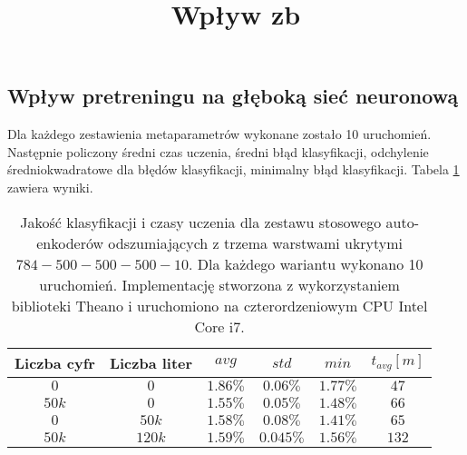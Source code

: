 \documentclass[fleqn]{scrartcl}
\begin{document}
\subsection{Wpływ pretreningu na głęboką sieć neuronową}
Dla każdego zestawienia metaparametrów wykonane zostało 10 uruchomień. Następnie policzony średni czas uczenia, średni błąd klasyfikacji, odchylenie średniokwadratowe dla błędów klasyfikacji, minimalny błąd klasyfikacji. Tabela \ref{table:results} zawiera wyniki.

\begin {table}
\title{Wpływ zb}
\begin{center}
\begin{tabular}{cc|ccc|c}
    \hline
    Liczba cyfr & Liczba liter    & $avg$     & $std$     & $min$      & $t_{avg}[m]$   \\
    \hline
    $0$ &    $0$           & $1.86\%$  & $0.06\%$  & $1.77\%$  &      $47$                    \\
    $50k$ & $0$            & $1.55\%$  & $0.05\%$  & $1.48\%$  &      $66$              \\
    $0$   & $50k$            & $1.58\%$  & $0.08\%$  & $1.41\%$  &      $65$             \\
    $50k$ & $120k$           & $1.59\%$  & $0.045\%$ & $1.56\%$  &    $132$  \\

\end{tabular}
\caption {Jakość klasyfikacji i czasy uczenia dla zestawu stosowego auto-enkoderów odszumiających z trzema warstwami ukrytymi $784 -500-500-500- 10$. Dla każdego wariantu wykonano 10 uruchomień. Implementację stworzona z wykorzystaniem biblioteki Theano i uruchomiono na czterordzeniowym CPU Intel Core i7.}
\label{table:results}
\end{center}
\end {table}
\end{document}
